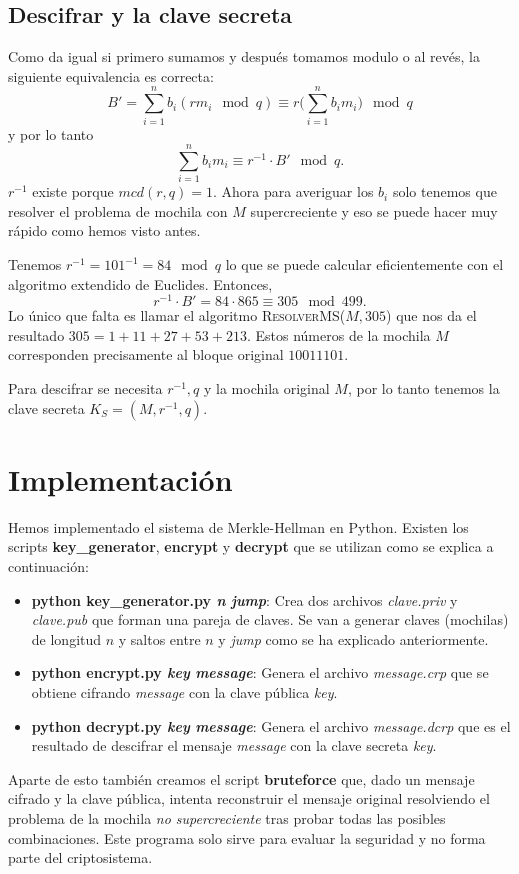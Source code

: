 \documentclass[12pt]{article}
\newenvironment{example}[1][Ejemplo]{\begin{trivlist}
\item[\hskip \labelsep {\bfseries #1}]}{\end{trivlist}}
\begin{document}
\subsection*{Descifrar y la clave secreta}
Como da igual si primero sumamos y después tomamos modulo o al revés, la siguiente equivalencia es correcta:
$$B' = \sum_{i=1}^nb_i(rm_i \mod q) \equiv r\big(\sum_{i=1}^nb_im_i\big)\mod q$$
y por lo tanto
$$\sum_{i=1}^nb_im_i \equiv r^{-1} \cdot B' \mod q.$$
$r^{-1}$ existe porque $mcd(r,q) = 1$. Ahora para averiguar los $b_i$ solo tenemos que resolver el problema de mochila con $M$ supercreciente y eso se puede hacer muy rápido como hemos visto antes.

\begin{example}
Tenemos $r^{-1} = 101^{-1}= 84 \mod q$ lo que se puede calcular eficientemente con el algoritmo extendido de Euclides. Entonces,
$$r^{-1} \cdot B' = 84 \cdot 865 \equiv 305 \mod 499.$$
Lo único que falta es llamar el algoritmo \textsc{ResolverMS}($M, 305$) que nos da el resultado $305 = 1 + 11 + 27 + 53 + 213$. Estos números de la mochila $M$ corresponden precisamente al bloque original $10011101$.
\end{example}
Para descifrar se necesita $r^{-1}, q$ y la mochila original $M$, por lo tanto tenemos la clave secreta $K_S = (M, r^{-1}, q)$.

\section{Implementación}

Hemos implementado el sistema de Merkle-Hellman en Python. Existen los scripts \textbf{key\_generator}, \textbf{encrypt} y \textbf{decrypt} que se utilizan como se explica a continuación:

\begin{itemize}
	\item \textbf{python key\_generator.py \textit{n} \textit{jump}}: Crea dos archivos \textit{clave.priv} y \textit{clave.pub} que forman una pareja de claves. Se van a generar claves (mochilas) de longitud $n$ y saltos entre $n$ y \textit{jump} como se ha explicado anteriormente.
	\item \textbf{python encrypt.py \textit{key} \textit{message}}: Genera el archivo \textit{message.crp} que se obtiene cifrando \textit{message} con la clave pública \textit{key}.
	\item \textbf{python decrypt.py \textit{key} \textit{message}}: Genera el archivo \textit{message.dcrp} que es el resultado de descifrar el mensaje \textit{message} con la clave secreta \textit{key}.
\end{itemize}
Aparte de esto también creamos el script \textbf{bruteforce} que, dado un mensaje cifrado y la clave pública, intenta reconstruir el mensaje original resolviendo el problema de la mochila \emph{no supercreciente} tras probar todas las posibles combinaciones. Este programa solo sirve para evaluar la seguridad y no forma parte del criptosistema.





 
\end{document}
